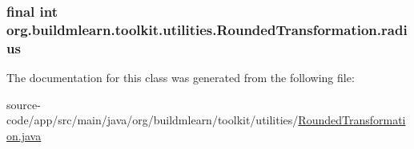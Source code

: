 \subsubsection[{\texorpdfstring{radius}{radius}}]{\setlength{\rightskip}{0pt plus 5cm}final int org.\+buildmlearn.\+toolkit.\+utilities.\+Rounded\+Transformation.\+radius\hspace{0.3cm}{\ttfamily [private]}}\hypertarget{classorg_1_1buildmlearn_1_1toolkit_1_1utilities_1_1RoundedTransformation_a6846ad52d24b8fcc6c4753a39399f6c6}{}\label{classorg_1_1buildmlearn_1_1toolkit_1_1utilities_1_1RoundedTransformation_a6846ad52d24b8fcc6c4753a39399f6c6}


The documentation for this class was generated from the following file\+:\begin{DoxyCompactItemize}
\item 
source-\/code/app/src/main/java/org/buildmlearn/toolkit/utilities/\hyperlink{RoundedTransformation_8java}{Rounded\+Transformation.\+java}\end{DoxyCompactItemize}
